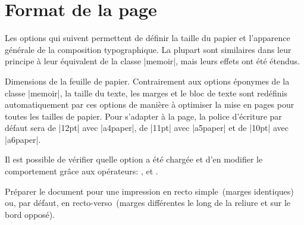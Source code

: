 \section{Format de la page}

Les options qui suivent permettent de définir la taille du papier et l'apparence générale de la composition typographique. La plupart sont similaires dans leur principe à leur équivalent de la classe |memoir|, mais leurs effets ont été étendus.

Dimensions de la feuille de papier. Contrairement aux options éponymes de la classe |memoir|, la taille du texte, les marges et le bloc de texte sont redéfinis automatiquement par ces options de manière à optimiser la mise en pages pour toutes les tailles de papier. Pour s'adapter à la page, la police d'écriture par défaut sera de |12pt| avec |a4paper|, de |11pt| avec |a5paper| et de |10pt| avec |a6paper|.

\begin{developer}
Il est possible de vérifier quelle option a été chargée et d'en modifier le comportement grâce aux opérateurs: ,  et .
\end{developer}

\begin{noprint}
\end{noprint}

Préparer le document pour une impression en recto simple~(marges identiques) ou, par défaut, en recto-verso~(marges différentes le long de la reliure et sur le bord opposé).

